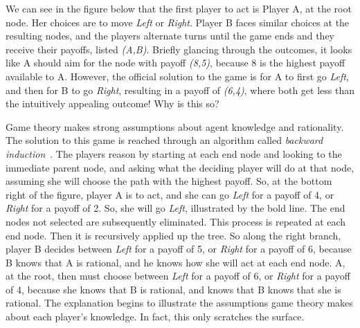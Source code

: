 We can see in the figure below that the first player to act is Player A, at the root node. Her choices are to move \emph{Left} or \emph{Right}. Player B faces similar choices at the resulting nodes, and the players alternate turns until the game ends and they receive their payoffs, listed \emph{(A,B)}. Briefly glancing through the outcomes, it looks like A should aim for the node with payoff \emph{(8,5)}, because 8 is the highest payoff available to A. However, the official solution to the game is for A to first go \emph{Left}, and then for B to go \emph{Right}, resulting in a payoff of \emph{(6,4)}, where both get less than the intuitively appealing outcome! Why is this so?

Game theory makes strong assumptions about agent knowledge and rationality. The solution to this game is reached through an algorithm called \emph{backward induction}~\cite{VB_TowardPlay}. The players reason by starting at each end node and looking to the immediate parent node, and asking what the deciding player will do at that node, assuming she will choose the path with the highest payoff. So, at the bottom right of the figure, player A is to act, and she can go \emph{Left} for a payoff of 4, or \emph{Right} for a payoff of 2. So, she will go \emph{Left}, illustrated by the bold line. The end nodes not selected are subsequently eliminated. This process is repeated at each end node. Then it is recursively applied up the tree. So along the right branch, player B decides between \emph{Left} for a payoff of 5, or \emph{Right} for a payoff of 6, because B knows that A is rational, and he knows how she will act at each end node. A, at the root, then must choose between \emph{Left} for a payoff of 6, or \emph{Right} for a payoff of 4, because she knows that B is rational, and knows that B knows that she is rational. The explanation begins to illustrate the assumptions game theory makes about each player's knowledge. In fact, this only scratches the surface.


